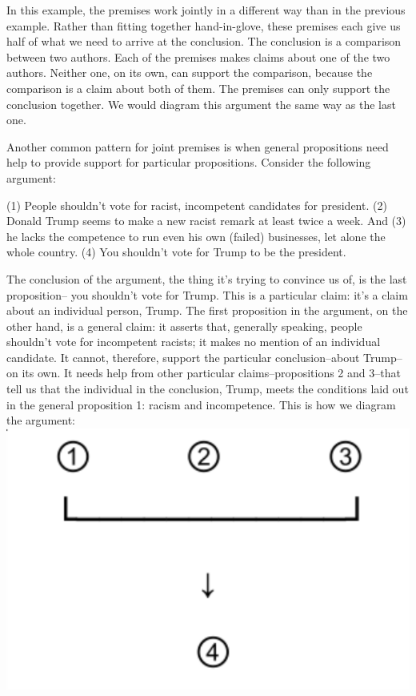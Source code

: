 In this example, the premises work jointly in a different way than in the previous example. Rather
than fitting together hand-in-glove, these premises each give us half of what we need to arrive at
the conclusion. The conclusion is a comparison between two authors. Each of the premises makes
claims about one of the two authors. Neither one, on its own, can support the comparison, because
the comparison is a claim about both of them. The premises can only support the conclusion
together. We would diagram this argument the same way as the last one.

Another common pattern for joint premises is when general propositions need help to provide
support for particular propositions. Consider the following argument:

(1) People shouldn't vote for racist, incompetent candidates for president. (2) Donald Trump
seems to make a new racist remark at least twice a week. And (3) he lacks the competence
to run even his own (failed) businesses, let alone the whole country. (4) You shouldn't vote
for Trump to be the president.

The conclusion of the argument, the thing it's trying to convince us of, is the last proposition--
you shouldn't vote for Trump. This is a particular claim: it's a claim about an individual person,
Trump. The first proposition in the argument, on the other hand, is a general claim: it asserts that,
generally speaking, people shouldn't vote for incompetent racists; it makes no mention of an
individual candidate. It cannot, therefore, support the particular conclusion--about Trump--on its
own. It needs help from other particular claims--propositions 2 and 3--that tell us that the
individual in the conclusion, Trump, meets the conditions laid out in the general proposition 1:
racism and incompetence. This is how we diagram the argument: \\

\includegraphics[scale=.49]{diagram4.pdf}


